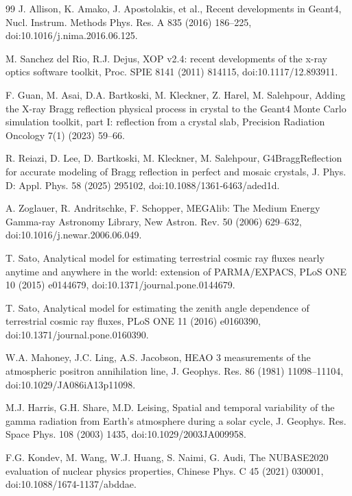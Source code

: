 \documentclass[11pt]{article}
\begin{document}
\begin{thebibliography}{99}
J. Allison, K. Amako, J. Apostolakis, et al., Recent developments in Geant4, Nucl. Instrum. Methods Phys. Res. A 835 (2016) 186--225, doi:10.1016/j.nima.2016.06.125.

M. Sanchez del Rio, R.J. Dejus, XOP v2.4: recent developments of the x-ray optics software toolkit, Proc. SPIE 8141 (2011) 814115, doi:10.1117/12.893911.

F. Guan, M. Asai, D.A. Bartkoski, M. Kleckner, Z. Harel, M. Salehpour, Adding the X-ray Bragg reflection physical process in crystal to the Geant4 Monte Carlo simulation toolkit, part I: reflection from a crystal slab, Precision Radiation Oncology 7(1) (2023) 59--66.

R. Reiazi, D. Lee, D. Bartkoski, M. Kleckner, M. Salehpour, G4BraggReflection for accurate modeling of Bragg reflection in perfect and mosaic crystals, J. Phys. D: Appl. Phys. 58 (2025) 295102, doi:10.1088/1361-6463/aded1d.

A. Zoglauer, R. Andritschke, F. Schopper, MEGAlib: The Medium Energy Gamma-ray Astronomy Library, New Astron. Rev. 50 (2006) 629--632, doi:10.1016/j.newar.2006.06.049.

T. Sato, Analytical model for estimating terrestrial cosmic ray fluxes nearly anytime and anywhere in the world: extension of PARMA/EXPACS, PLoS ONE 10 (2015) e0144679, doi:10.1371/journal.pone.0144679.

T. Sato, Analytical model for estimating the zenith angle dependence of terrestrial cosmic ray fluxes, PLoS ONE 11 (2016) e0160390, doi:10.1371/journal.pone.0160390.

W.A. Mahoney, J.C. Ling, A.S. Jacobson, HEAO 3 measurements of the atmospheric positron annihilation line, J. Geophys. Res. 86 (1981) 11098--11104, doi:10.1029/JA086iA13p11098.

M.J. Harris, G.H. Share, M.D. Leising, Spatial and temporal variability of the gamma radiation from Earth's atmosphere during a solar cycle, J. Geophys. Res. Space Phys. 108 (2003) 1435, doi:10.1029/2003JA009958.

F.G. Kondev, M. Wang, W.J. Huang, S. Naimi, G. Audi, The NUBASE2020 evaluation of nuclear physics properties, Chinese Phys. C 45 (2021) 030001, doi:10.1088/1674-1137/abddae.


\end{thebibliography}
\end{document}
